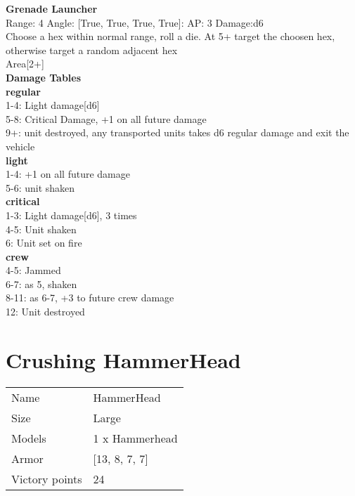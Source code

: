 {\bf Grenade Launcher } \\



Range: 4  Angle: [True, True, True, True]: AP: 3 Damage:d6 \\
Choose a hex within normal range, roll a die. At 5+ target the choosen hex, otherwise target a random adjacent hex\\ 
Area[2+]\\ 




 





{\bf Damage Tables} \\
 {\bf regular } \\
1-4: Light damage[d6] \\
5-8: Critical Damage, +1 on all future damage \\
9+: unit destroyed, any transported units takes d6 regular damage and exit the vehicle \\
 {\bf light } \\
1-4: +1 on all future damage \\
5-6: unit shaken \\
 {\bf critical } \\
1-3: Light damage[d6], 3 times \\
4-5: Unit shaken \\
6: Unit set on fire \\
 {\bf crew } \\
4-5: Jammed \\
6-7: as 5, shaken \\
8-11: as 6-7, +3 to future crew damage \\
12: Unit destroyed \\










\pagebreak\pagebreak

\section{ Crushing HammerHead }

\begin{tabular}{ll}
  Name & HammerHead \\
  Size & Large\\
  Models & 1 x Hammerhead\\
  Armor & [13, 8, 7, 7]\\
  Victory points & 24\\
\end{tabular}



